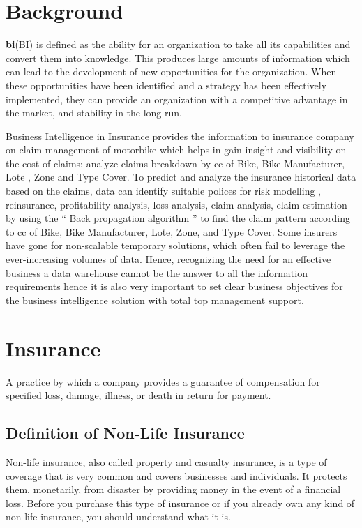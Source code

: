 \section{Background}\label{sec:bkgrnd}%
\textbf {\acl{bi}}(BI) is defined as the ability for an organization to take all its capabilities and convert them into knowledge. This produces large amounts of information which can lead to the development of new opportunities for the organization. When these opportunities have been identified and a strategy has been effectively implemented, they can provide an organization with a competitive advantage in the market, and stability in the long run.\cite{chen2012business}
\par
Business Intelligence in Insurance provides the information to insurance company on claim management of motorbike which helps in gain insight and visibility on the cost of claims; analyze claims breakdown by \acs{cc} of Bike, Bike Manufacturer, Lote , Zone and Type Cover. 
To predict and analyze the insurance historical data based on the claims, data can identify suitable polices for risk modelling , reinsurance, profitability analysis, loss analysis, claim analysis, claim estimation by  using the “ Back propagation algorithm ” to find the claim pattern according to \acs{cc} of Bike, Bike Manufacturer, Lote, Zone, and Type Cover.
Some insurers have gone for non-scalable temporary solutions, which often fail to leverage the ever-increasing volumes of data. Hence, recognizing the need for an effective business a data warehouse cannot be the answer to all the information requirements hence it is also very important to set clear business objectives for the business intelligence solution with total top management support.
 \par
\newpage
\section{Insurance}
A practice by which a company provides a guarantee of compensation for specified loss, damage, illness, or death in return for payment. 
\subsection{Definition of Non-Life Insurance }
Non-life insurance, also called property and casualty insurance, is a type of coverage that is very common and covers businesses and individuals. It protects them, monetarily, from disaster by providing money in the event of a financial loss. Before you purchase this type of insurance or if you already own any kind of non-life insurance, you should understand what it is.

